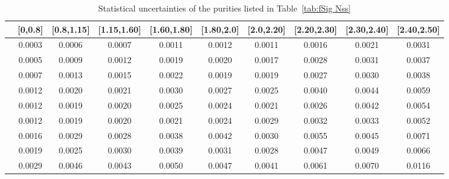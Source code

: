 \begin{table}
\footnotesize
\centering
\begin{tabular}{c|c|c|c|c|c|c|c|c|c}
  \hline
  &[0,0.8] &[0.8,1.15] &[1.15,1.60] &[1.60,1.80] &[1.80,2.0] &[2.0,2.20] &[2.20,2.30] &[2.30,2.40] &[2.40,2.50] \\
  \hline
  [0,0.8] &0.0003 &0.0006 &0.0007 &0.0011 &0.0012 &0.0011 &0.0016 &0.0021 &0.0031 \\
  \hline
  [0.8,1.15] &0.0005 &0.0009 &0.0012 &0.0019 &0.0020 &0.0017 &0.0028 &0.0031 &0.0037 \\
  \hline
  [1.15,1.60] &0.0007 &0.0013 &0.0015 &0.0022 &0.0019 &0.0019 &0.0027 &0.0030 &0.0038 \\
  \hline
  [1.60,1.80] &0.0012 &0.0020 &0.0021 &0.0030 &0.0027 &0.0025 &0.0040 &0.0044 &0.0059 \\
  \hline
  [1.80,2.0] &0.0012 &0.0019 &0.0020 &0.0025 &0.0024 &0.0021 &0.0026 &0.0042 &0.0054 \\
  \hline
  [2.0,2.20] &0.0012 &0.0019 &0.0020 &0.0021 &0.0024 &0.0029 &0.0032 &0.0033 &0.0052 \\
  \hline
  [2.20,2.30] &0.0016 &0.0029 &0.0028 &0.0038 &0.0042 &0.0030 &0.0055 &0.0045 &0.0071 \\
  \hline
  [2.30,2.40] &0.0019 &0.0025 &0.0030 &0.0039 &0.0031 &0.0028 &0.0047 &0.0049 &0.0066 \\
  \hline
  [2.40,2.50] &0.0029 &0.0046 &0.0043 &0.0050 &0.0047 &0.0041 &0.0061 &0.0070 &0.0116 \\ 
  \hline
\end{tabular}
\caption{Statistical uncertainties of the purities listed in Table~\ref{tab:fSig Nss}}
\label{tab:fSig error Nss}
\end{table}

